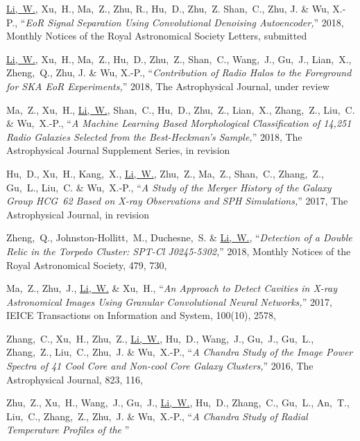 \begin{publications}{99}
  \item \ul{Li,~W.}, Xu,~H., Ma,~Z., Zhu, R., Hu,~D., Zhu,~Z.
    Shan,~C., Zhu, J. \& Wu, X.-P.,
    \enquote{\it EoR Signal Separation Using Convolutional Denoising
      Autoencoder,}
    2018, Monthly Notices of the Royal Astronomical Society Letters,
    submitted
  \item \ul{Li,~W.}, Xu,~H., Ma,~Z., Hu,~D., Zhu,~Z., Shan,~C.,
    Wang,~J., Gu,~J., Lian,~X., Zheng,~Q., Zhu, J. \& Wu, X.-P.,
    \enquote{\it Contribution of Radio Halos to the Foreground for
      SKA EoR Experiments,}
    2018, The Astrophysical Journal,
    under review
  \item Ma,~Z., Xu,~H., \ul{Li,~W.}, Shan,~C., Hu,~D., Zhu,~Z.,
    Lian,~X., Zhang,~Z., Liu,~C. \& Wu,~X.-P.,
    \enquote{\it A Machine Learning Based Morphological Classification
      of 14,251 Radio Galaxies Selected from the Best-Heckman's Sample,}
    2018, The Astrophysical Journal Supplement Series,
    in revision
  \item Hu,~D., Xu,~H., Kang,~X., \ul{Li,~W.}, Zhu,~Z., Ma,~Z.,
    Shan,~C., Zhang,~Z., Gu,~L., Liu,~C. \& Wu,~X.-P.,
    \enquote{\it A Study of the Merger History of the Galaxy Group
      HCG~62 Based on X-ray Observations and SPH Simulations,}
    2017, The Astrophysical Journal,
    in revision
  \item Zheng,~Q., Johnston-Hollitt,~M., Duchesne,~S. \& \ul{Li,~W.},
    \enquote{\it Detection of a Double Relic in the Torpedo Cluster:
      SPT-Cl J0245-5302,}
    2018, Monthly Notices of the Royal Astronomical Society, 479, 730,
  \item Ma,~Z., Zhu,~J., \ul{Li,~W.} \& Xu,~H.,
    \enquote{\it An Approach to Detect Cavities in X-ray Astronomical
      Images Using Granular Convolutional Neural Networks,}
    2017, IEICE Transactions on Information and System, 100(10), 2578,
  \item Zhang,~C., Xu,~H., Zhu,~Z., \ul{Li,~W.}, Hu,~D., Wang,~J.,
    Gu,~J., Gu,~L., Zhang,~Z., Liu,~C., Zhu,~J. \& Wu,~X.-P.,
    \enquote{\it A Chandra Study of the Image Power Spectra of 41
      Cool Core and Non-cool Core Galaxy Clusters,}
    2016, The Astrophysical Journal, 823, 116,
  \item Zhu,~Z., Xu,~H., Wang,~J., Gu,~J., \ul{Li,~W.}, Hu,~D.,
    Zhang,~C., Gu,~L., An,~T., Liu,~C., Zhang,~Z., Zhu,~J. \& Wu,~X.-P.,
    \enquote{\it A Chandra Study of Radial Temperature Profiles of the
}
\end{publications}
